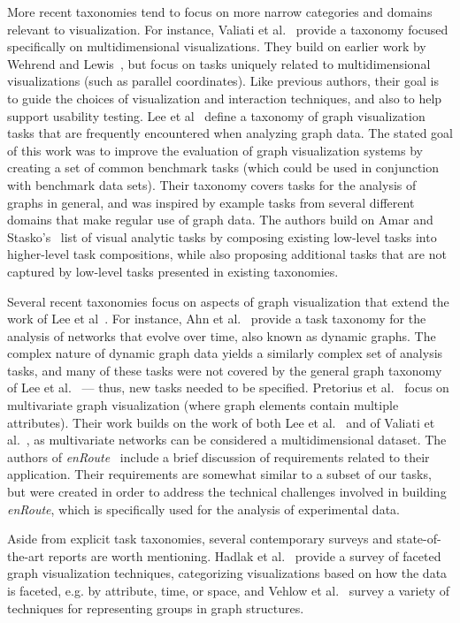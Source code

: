 \documentclass[twocolumn]{bmcart}%
\begin{document}
More recent taxonomies tend to focus on more narrow categories and domains relevant to visualization.
For instance, Valiati et al.~\cite{Valiati2006} provide a taxonomy focused specifically on multidimensional visualizations.
They build on earlier work by Wehrend and Lewis~\cite{Wehrend1990}, but focus on tasks uniquely related to multidimensional visualizations (such as parallel coordinates).
Like previous authors, their goal is to guide the choices of visualization and interaction techniques, and also to help support usability testing.
Lee et al~\cite{Lee2006} define a taxonomy of graph visualization tasks that are frequently encountered when analyzing graph data.
The stated goal of this work was to improve the evaluation of graph visualization systems by creating a set of common benchmark tasks (which could be used in conjunction with benchmark data sets).
Their taxonomy covers tasks for the analysis of graphs in general, and was inspired by example tasks from several different domains that make regular use of graph data.
The authors build on Amar and Stasko's~\cite{Amar2005} list of visual analytic tasks by composing existing low-level tasks into higher-level task compositions, while also proposing additional tasks that are not captured by low-level tasks presented in existing taxonomies.

Several recent taxonomies focus on aspects of graph visualization that extend the work of Lee et al~\cite{Lee2006}.
For instance, Ahn et al.~\cite{Ahn2014} provide a task taxonomy for the analysis of networks that evolve over time, also known as dynamic graphs.
The complex nature of dynamic graph data yields a similarly complex set of analysis tasks, and many of these tasks were not covered by the general graph taxonomy of Lee et al.~\cite{Lee2006} --- thus, new tasks needed to be specified.
Pretorius et al.~\cite{Pretorius2014} focus on multivariate graph visualization (where graph elements contain multiple attributes).
Their work builds on the work of both Lee et al.~\cite{Lee2006} and of Valiati et al.~\cite{Valiati2006}, as multivariate networks can be considered a multidimensional dataset.
The authors of \textit{enRoute}~\cite{partl2012enroute} include a brief discussion of requirements related to their application.
Their requirements are somewhat similar to a subset of our tasks, but were created in order to address the technical challenges involved in building \textit{enRoute}, which is specifically used for the analysis of experimental data.

Aside from explicit task taxonomies, several contemporary surveys and state-of-the-art reports are worth mentioning.
Hadlak et al.~\cite{hadlak2015survey} provide a survey of faceted graph visualization techniques, categorizing visualizations based on how the data is faceted, e.g. by attribute, time, or space, and Vehlow et al.~\cite{vehlow2015state} survey a variety of techniques for representing groups in graph structures.
\end{document}
